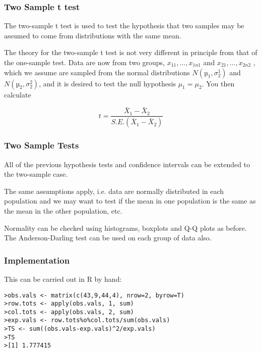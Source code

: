 


\subsubsection{Two Sample t test}

The two-sample t test is used to test the hypothesis that two samples may
be assumed to come from distributions with the same mean.

The theory for the two-sample t test is not very different in principle from
that of the one-sample test. Data are now from two groups, $x_{11}, . . . , x_{1n1}$
and $x_{21}, . . . , x_{2n2}$ , which we assume are sampled from the normal distributions
$N(µ_{1}, \sigma^{1}_{2} )$ and
$N(µ_{2}, \sigma^{2}_{2} )$, and it is desired to test the null hypothesis
$\mu_{1} = \mu_{2}$. You then calculate

\[
t = \frac{\bar{X}_{1}-\bar{X}_{2}}{S.E.(\bar{X}_{1}-\bar{X}_{2})}
\]


\subsubsection{Two Sample Tests}


All of the previous hypothesis tests and confidence intervals can be
extended to the two-sample case.

The same assumptions apply, i.e. data are normally distributed in
each population and we may want to test if the mean in one
population is the same as the mean in the other population, etc.

Normality can be checked using histograms, boxplots and Q-Q
plots as before. The Anderson-Darling test can be used on
each group of data also.


\subsubsection{Implementation}

This can be carried out in R by hand:

\footnotesize \begin{verbatim}
>obs.vals <- matrix(c(43,9,44,4), nrow=2, byrow=T)
>row.tots <- apply(obs.vals, 1, sum)
>col.tots <- apply(obs.vals, 2, sum)
>exp.vals <- row.tots%o%col.tots/sum(obs.vals)
>TS <- sum((obs.vals-exp.vals)^2/exp.vals)
>TS
>[1] 1.777415
 \end{verbatim}\normalsize


